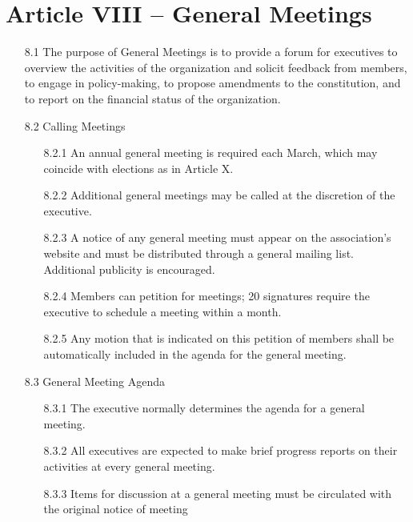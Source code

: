 \documentclass[12pt,a4paper]{article}
\begin{document}
\section*{Article VIII – General Meetings}

\begin{enumerate}
\item[8.1] The purpose of General Meetings is to provide a forum for executives to overview the activities of the organization and solicit feedback from members, to engage in policy-making, to propose amendments to the constitution, and to report on the financial status of the organization.

\item[8.2] Calling Meetings

\begin{enumerate}
\item[8.2.1] An annual general meeting is required each March, which may coincide with elections as in Article X.

\item[8.2.2] Additional general meetings may be called at the discretion of the executive.

\item[8.2.3] A notice of any general meeting must appear on the association's website and must be distributed through a general mailing list. Additional publicity is encouraged.

\item[8.2.4] Members can petition for meetings; 20 signatures require the executive to schedule a meeting within a month. 

\item[8.2.5] Any motion that is indicated on this petition of members shall be automatically included in the agenda for the general meeting.
\end{enumerate}

\item[8.3] General Meeting Agenda

\begin{enumerate}
\item[8.3.1] The executive normally determines the agenda for a general meeting.

\item[8.3.2] All executives are expected to make brief progress reports on their activities at every general meeting.

\item[8.3.3] Items for discussion at a general meeting must be circulated with the original notice of meeting


\end{enumerate}
\end{enumerate}
\end{document}
